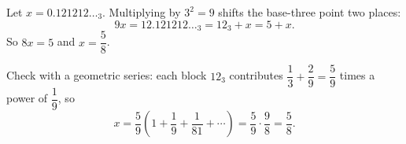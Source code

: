 Let $x=0.121212\ldots_3$. Multiplying by $3^2=9$ shifts the base-three point two places:
\[9x=12.121212\ldots_3=12_3+x=5+x.\]
So $8x=5$ and $x=\boxed{\dfrac{5}{8}}$.

Check with a geometric series: each block $12_3$ contributes $\dfrac{1}{3}+\dfrac{2}{9}=\dfrac{5}{9}$ times a power of $\dfrac{1}{9}$, so
\[x=\dfrac{5}{9}\left(1+\dfrac{1}{9}+\dfrac{1}{81}+\cdots\right)=\dfrac{5}{9}\cdot\dfrac{9}{8}=\dfrac{5}{8}.\]
